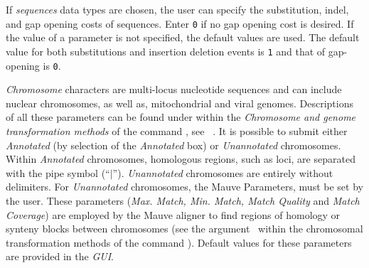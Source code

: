  
\begin{description}
\setlength{\labelsep}{5pt}
\setlength{\itemindent}{0pt}%
\setlength{\parindent}{0.5cm}        
        
	\item [Sequence Parameters]  If \emph{sequences} data types are chosen, the user can specify the 
		substitution, indel, and gap opening costs of sequences. Enter \texttt{0} if no gap opening 
		cost is desired. If the value of a parameter is not specified, the default values are used. 
		The default value for both substitutions and insertion deletion events is \texttt{1} and 
		that of gap-opening is \texttt{0}. 

	\item [Chromosome and Mauve Parameters] \emph{Chromosome} characters are multi-locus 
		nucleotide sequences and can include nuclear chromosomes, as well as, mitochondrial 
		and viral genomes.  Descriptions of all these parameters can be found under within 
		the \emph{Chromosome and genome transformation methods} of the command , 
		see ~.  It is possible to submit either \emph{Annotated} (by selection of the 
		\emph{Annotated} box) or \emph{Unannotated} chromosomes. Within \emph{Annotated} 
		chromosomes,  homologous regions, such as loci, are separated with the pipe symbol
		(``$\vert$'').  \emph{Unannotated} chromosomes are entirely 
		without delimiters. For \emph{Unannotated} chromosomes, the Mauve Parameters, must be set
		by the user.  These parameters (\emph{Max. Match, Min. Match, Match Quality} and \emph {Match 
		Coverage}) are employed by the Mauve aligner to find regions of homology or synteny blocks 
		 between chromosomes (see the argument~ 
		 within the chromosomal transformation methods of the command ). 
		 Default values for these parameters are provided in the \emph{GUI}.
		            	

\end{description}
